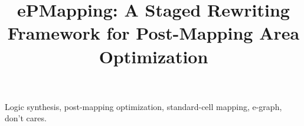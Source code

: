 \documentclass[conference]{IEEEtran}
\begin{document}
\title{
    ePMapping: A Staged Rewriting Framework for Post-Mapping Area Optimization
}

\author{} %

\IEEEaftertitletext{\vspace{-0.6\baselineskip}}

\maketitle

\begin{abstract}
    
\end{abstract}

\begin{IEEEkeywords}
    Logic synthesis, post-mapping optimization, standard-cell mapping, e-graph, don't cares.
\end{IEEEkeywords}







\clearpage
{}


\end{document}
